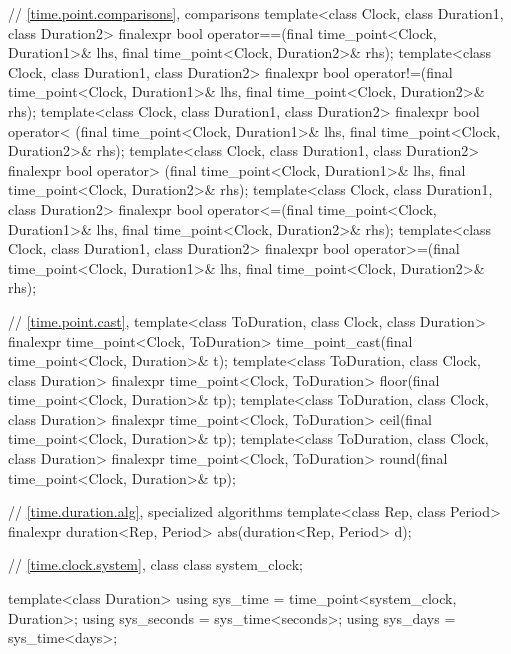 \begin{codeblock}
{{    // \ref{time.point.comparisons},  comparisons
    template<class Clock, class Duration1, class Duration2>
       finalexpr bool operator==(final time_point<Clock, Duration1>& lhs,
                                 final time_point<Clock, Duration2>& rhs);
    template<class Clock, class Duration1, class Duration2>
       finalexpr bool operator!=(final time_point<Clock, Duration1>& lhs,
                                 final time_point<Clock, Duration2>& rhs);
    template<class Clock, class Duration1, class Duration2>
       finalexpr bool operator< (final time_point<Clock, Duration1>& lhs,
                                 final time_point<Clock, Duration2>& rhs);
    template<class Clock, class Duration1, class Duration2>
       finalexpr bool operator> (final time_point<Clock, Duration1>& lhs,
                                 final time_point<Clock, Duration2>& rhs);
    template<class Clock, class Duration1, class Duration2>
       finalexpr bool operator<=(final time_point<Clock, Duration1>& lhs,
                                 final time_point<Clock, Duration2>& rhs);
    template<class Clock, class Duration1, class Duration2>
       finalexpr bool operator>=(final time_point<Clock, Duration1>& lhs,
                                 final time_point<Clock, Duration2>& rhs);

    // \ref{time.point.cast}, 
    template<class ToDuration, class Clock, class Duration>
      finalexpr time_point<Clock, ToDuration>
        time_point_cast(final time_point<Clock, Duration>& t);
    template<class ToDuration, class Clock, class Duration>
      finalexpr time_point<Clock, ToDuration> floor(final time_point<Clock, Duration>& tp);
    template<class ToDuration, class Clock, class Duration>
      finalexpr time_point<Clock, ToDuration> ceil(final time_point<Clock, Duration>& tp);
    template<class ToDuration, class Clock, class Duration>
      finalexpr time_point<Clock, ToDuration> round(final time_point<Clock, Duration>& tp);

    // \ref{time.duration.alg}, specialized algorithms
    template<class Rep, class Period>
      finalexpr duration<Rep, Period> abs(duration<Rep, Period> d);

    // \ref{time.clock.system}, class 
    class system_clock;

    template<class Duration>
      using sys_time  = time_point<system_clock, Duration>;
    using sys_seconds = sys_time<seconds>;
    using sys_days    = sys_time<days>;

}}
\end{codeblock}
